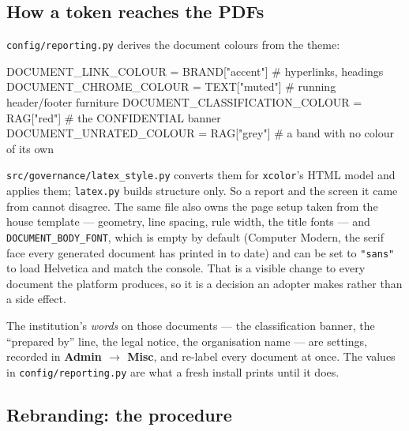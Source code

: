 \documentclass[11pt]{article}
\begin{document}
\subsection{How a token reaches the PDFs}

\texttt{config/reporting.py} derives the document colours from the theme:

\begin{code}
DOCUMENT_LINK_COLOUR           = BRAND["accent"]   # hyperlinks, headings
DOCUMENT_CHROME_COLOUR         = TEXT["muted"]     # running header/footer furniture
DOCUMENT_CLASSIFICATION_COLOUR = RAG["red"]        # the CONFIDENTIAL banner
DOCUMENT_UNRATED_COLOUR        = RAG["grey"]       # a band with no colour of its own
\end{code}

\texttt{src/governance/latex\_style.py} converts them for \texttt{xcolor}'s HTML model and
applies them; \texttt{latex.py} builds structure only. So a report and the screen it came
from cannot disagree. The same file also owns the page setup taken from the house template
--- geometry, line spacing, rule width, the title fonts --- and
\texttt{DOCUMENT\_BODY\_FONT}, which is empty by default (Computer Modern, the serif face
every generated document has printed in to date) and can be set to \texttt{"sans"} to load
Helvetica and match the console. That is a visible change to every document the platform
produces, so it is a decision an adopter makes rather than a side effect.

The institution's \emph{words} on those documents --- the classification banner, the
``prepared by'' line, the legal notice, the organisation name --- are settings, recorded in
\textbf{Admin \(\rightarrow\) Misc}, and re-label every document at once. The values in
\texttt{config/reporting.py} are what a fresh install prints until it does.

\subsection{Rebranding: the procedure}
\end{document}
